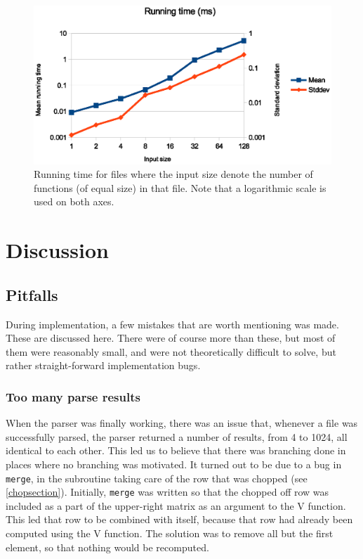 \documentclass[a4paper,12pt,twosided]{report}
\begin{document}
\begin{figure}[H]
\includegraphics[width=\textwidth]{criterion-1-128.eps}
\caption{\label{criterion}Running time for files where the input size denote the
number of functions (of equal size) in that file. Note that a logarithmic scale
is used on both axes.}
\end{figure}

%
%
\chapter{Discussion}

\section{Pitfalls}
During implementation, a few mistakes that are worth mentioning was made. These
are discussed here. There were of course more than these, but most of them were
reasonably small, and were not theoretically difficult to solve, but rather
straight-forward implementation bugs. 

\subsection{Too many parse results}
When the parser was finally working, there was an issue that, whenever a file
was successfully parsed, the parser returned a number of results, from 4 to
1024, all identical to each other. This led us to believe that there was
branching done in places where no branching was motivated. It turned out to be
due to a bug in \texttt{merge}, in the subroutine taking care of the row that
was chopped (see \ref{chopsection}). Initially, \texttt{merge} was written so
that the chopped off row was included as a part of the upper-right matrix as an
argument to the V function. This led that row to be combined with itself,
because that row had already been computed using the V function. The solution
was to remove all but the first element, so that nothing would be recomputed.
\end{document}
